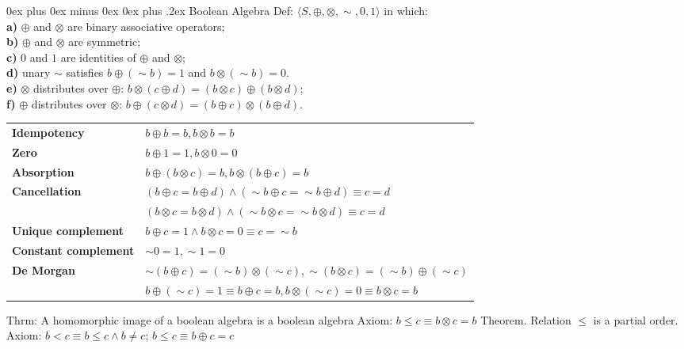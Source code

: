 \documentclass[letterpaper, 8pt]{extarticle}
\makeatletter
\renewcommand{\subsection}{\@startsection{subsection}{2}{0mm}%
                                {0ex plus 0ex minus 0ex}%
                                {0ex plus .2ex}%
                                {\normalfont\small\bfseries}}
\makeatother
\begin{document}
\begin{multicols*}{3}
    \subsection{Boolean Algebra}
    Def: $\langle S, \oplus, \otimes, \sim, 0, 1 \rangle$ in which: \\
    \textbf{a)} $\oplus$ and $\otimes$ are binary associative operators; \\
    \textbf{b)} $\oplus$ and $\otimes$ are symmetric; \\
    \textbf{c)} $0$ and $1$ are identities of $\oplus$ and $\otimes$; \\
    \textbf{d)} unary $\sim$ satisfies $b \oplus (\sim b) = 1$ and $b \otimes (\sim b) = 0$. \\
    \textbf{e)} $\otimes$ distributes over $\oplus$: $b \otimes (c \oplus d) = (b \otimes c) \oplus (b \otimes d)$; \\
    \textbf{f)} $\oplus$ distributes over $\otimes$: $b \oplus (c \otimes d) = (b \oplus c) \otimes (b \oplus d)$.

    \begin{tabulary}{\linewidth}{@{}LL@{}}
        \textbf{Idempotency} & $b \oplus b = b, b \otimes b = b$ \\
        \textbf{Zero} & $b \oplus 1 = 1, b \otimes 0 = 0$ \\
        \textbf{Absorption} & $b \oplus (b \otimes c) = b, b \otimes (b \oplus c) = b$ \\
        \textbf{Cancellation} & $(b \oplus c = b \oplus d) \land (\sim b \oplus c = \sim b \oplus d) \equiv c = d$ \\
                              & $(b \otimes c = b \otimes d) \land (\sim b \otimes c = \sim b \otimes d) \equiv c = d$ \\
        \textbf{Unique complement} & $b \oplus c = 1 \land b \otimes c = 0 \equiv c = \sim b$ \\
        \textbf{Constant complement} & $\sim 0 = 1, \sim 1 = 0$ \\
        \textbf{De Morgan} & $\sim (b \oplus c) = (\sim b) \otimes (\sim c), \sim (b \otimes c) = (\sim b) \oplus (\sim c)$ \\
        & $b \oplus (\sim c) = 1 \equiv b \oplus c = b, b \otimes (\sim c) = 0 \equiv b \otimes c = b$ \\
    \end{tabulary}
    
    Thrm: A homomorphic image of a boolean algebra is a boolean algebra
    Axiom: $b \leq c \equiv b \otimes c = b$ Theorem. Relation $\leq$ is a partial order.
    Axiom: $b < c \equiv b \leq c \land b \neq c$; $b \leq c \equiv b \oplus c = c$


\end{multicols*}
\end{document}
